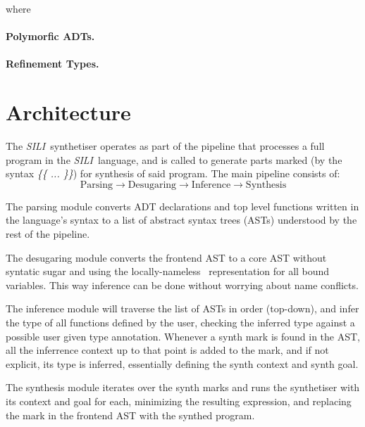 \documentclass{llncs}
\newcommand{\mypara}[1]{\paragraph{\textbf{#1}.}}
\newcommand{\synname}{\emph{SILI}}
\begin{document}
where



\mypara{Polymorfic ADTs}

\mypara{Refinement Types}



\section{Architecture}

The \synname\ synthetiser operates as part of the pipeline that processes a
full program in the \synname\ language, and is called to generate parts marked
(by the syntax \emph{\{\{ ... \}\}}) for
synthesis of said program. The main pipeline consists of:
\[
    \textrm{Parsing} \rightarrow \textrm{Desugaring} \rightarrow \textrm{Inference} \rightarrow \textrm{Synthesis}
\]

The parsing module converts ADT declarations and top level functions written in
the language's syntax to a list of abstract syntax trees (ASTs) understood by the rest of the
pipeline.

The desugaring module converts the frontend AST to a core AST without syntatic
sugar and using the locally-nameless~\cite{locally nameless} representation for
all bound variables. This way inference can be done without worrying about name
conflicts.

The inference module will traverse the list of ASTs in order (top-down), and
infer the type of all functions defined by the user, checking the inferred
type against a possible user given type annotation. Whenever a synth mark is
found in the AST, all the inferrence context up to that point is added to the
mark, and if not explicit, its type is inferred, essentially defining the synth
context and synth goal.

The synthesis module iterates over the synth marks and runs the synthetiser with
its context and goal for each, minimizing the resulting expression, and
replacing the mark in the frontend AST with the synthed program.
\end{document}
